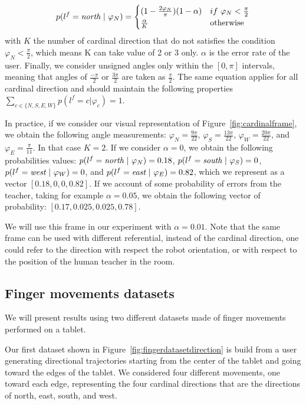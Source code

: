 \begin{equation}
    p(l^f = \emph{north}~|~\varphi_N) = 
    \begin{cases}
    (1 - \frac{2 \varphi_N}{\pi}) (1-\alpha) & if~\varphi_N < \frac{\pi}{2}\\
        \frac{\alpha}{K}  & \text{otherwise}\\
   \end{cases}
   \label{eq:cardinalframe}
\end{equation}
with $K$ the number of cardinal direction that do not satisfies the condition $\varphi_N < \frac{\pi}{2}$, which means K can take value of 2 or 3 only. $\alpha$ is the error rate of the user. Finally, we consider unsigned angles only within the $[0, \pi]$ intervals, meaning that angles of $\frac{-\pi}{2}$ or $\frac{3\pi}{2}$ are taken as $\frac{\pi}{2}$. The same equation applies for all cardinal direction and should maintain the following properties $\sum_{c \in \{N,S,E,W\}} p(l^f = c |\varphi_c) = 1$.

In practice, if we consider our visual representation of Figure~\ref{fig:cardinalframe}, we obtain the following angle measurements: $\varphi_N = \frac{9\pi}{22}$, $\varphi_S = \frac{13\pi}{22}$, $\varphi_W = \frac{20\pi}{22}$, and $\varphi_E = \frac{\pi}{11}$. In that case $K = 2$. If we consider $\alpha = 0$, we obtain the following probabilities values: $p(l^f = \emph{north}~|~\varphi_N) = 0.18$, $p(l^f = \emph{south}~|~\varphi_S) = 0$, $p(l^f = \emph{west}~|~\varphi_W) = 0$, and $p(l^f = \emph{east}~|~\varphi_E) = 0.82$, which we represent as a vector $[0.18,0,0,0.82]$. If we account of some probability of errors from the teacher, taking for example $\alpha = 0.05$, we obtain the following vector of probability: $[0.17, 0.025, 0.025,0.78]$.

We will use this frame in our experiment with $\alpha = 0.01$. Note that the same frame can be used with different referential, instead of the cardinal direction, one could refer to the direction with respect the robot orientation, or with respect to the position of the human teacher in the room.

\subsection{Finger movements datasets}

We will present results using two different datasets made of finger movements performed on a tablet. 

Our first dataset shown in Figure~\ref{fig:fingerdatasetdirection} is build from a user generating directional trajectories starting from the center of the tablet and going toward the edges of the tablet. We considered four different movements, one toward each edge, representing the four cardinal directions that are the directions of north, east, south, and west.

